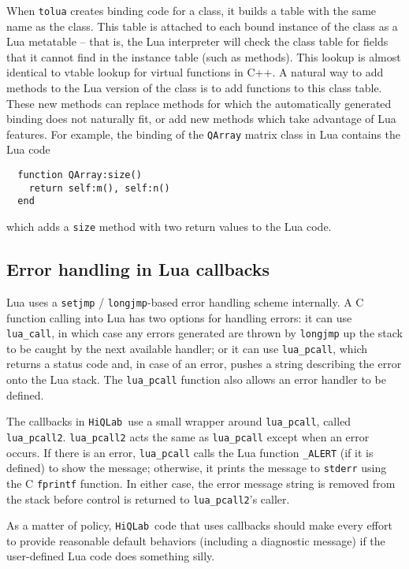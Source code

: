 \documentclass{article}
\newcommand{\hiq}{\texttt{HiQLab}}
\newcommand{\ttt}[1]{\texttt{#1}}
\begin{document}
When \ttt{tolua} creates binding code for a class, it builds a table
with the same name as the class.  This table is attached to each bound
instance of the class as a Lua metatable -- that is, the Lua
interpreter will check the class table for fields that it cannot find
in the instance table (such as methods).  This lookup is almost
identical to vtable lookup for virtual functions in C++. A natural way
to add methods to the Lua version of the class is to add functions to
this class table.  These new methods can replace methods for which the
automatically generated binding does not naturally fit, or add new
methods which take advantage of Lua features.  For example, the
binding of the \ttt{QArray} matrix class in Lua contains the Lua code
\begin{verbatim}
  function QArray:size()
    return self:m(), self:n()
  end
\end{verbatim}
which adds a \ttt{size} method with two return values to the Lua code.


\subsection{Error handling in Lua callbacks}
\label{section-lua-error-handling}

Lua uses a \ttt{setjmp} / \ttt{longjmp}-based error handling
scheme internally.  A C function calling into Lua has two options for
handling errors: it can use \ttt{lua\_call}, in which case any
errors generated are thrown by \ttt{longjmp} up the stack to be
caught by the next available handler; or it can use
\ttt{lua\_pcall}, which returns a status code and, in case of an
error, pushes a string describing the error onto the Lua stack.  The
\ttt{lua\_pcall} function also allows an error handler to be defined.

The callbacks in \hiq\ use a small wrapper around \ttt{lua\_pcall},
called \ttt{lua\_pcall2}.  \ttt{lua\_pcall2} acts the same as
\ttt{lua\_pcall} except when an error occurs.  If there is an
error, \ttt{lua\_pcall} calls the Lua function \ttt{\_ALERT} (if
it is defined) to show the message; otherwise, it prints the message
to \ttt{stderr} using the C \ttt{fprintf} function.  In either
case, the error message string is removed from the stack before
control is returned to \ttt{lua\_pcall2}'s caller.

As a matter of policy, \hiq\ code that uses callbacks should make
every effort to provide reasonable default behaviors (including a
diagnostic message) if the user-defined Lua code does something silly.
\end{document}
